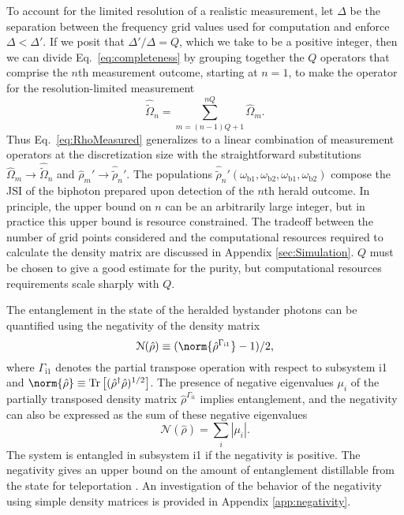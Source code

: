 \documentclass[twocolumn,amssymb, nobibnotes, showpacs, aps, pra,10pt]{revtex4-1}
\newcommand*{\wbone}{\omega_{\textrm{b}1}}
\newcommand*{\wbtwo}{\omega_{\textrm{b}2}}
\DeclareMathOperator*{\trace}{\textrm{Tr}}
\begin{document}
To account for the limited resolution of a realistic measurement, let $\Delta$ be the separation between the frequency grid values used for computation and enforce $\Delta < \Delta'$. If we posit that $\Delta'/\Delta = Q$, which we take to be a positive integer, then we can divide Eq.\ \eqref{eq:completeness} by grouping together the $Q$ operators that comprise the $n$th measurement outcome, starting at $n=1$, to make the operator for the resolution-limited measurement
\begin{equation}\label{eq:binDef}
\hat{\widetilde{\Omega}}_{n} = \sum_{m=(n-1)Q+1}^{nQ} \hat{\Omega}_{m}.
\end{equation}
Thus Eq.\ \eqref{eq:RhoMeasured} generalizes to a linear combination of measurement operators at the discretization size with the straightforward substitutions $\hat{\Omega}_m \to \hat{\widetilde{\Omega}}_{n}$ and $\hat{\rho}_m' \to \hat{\widetilde{\rho}}_n'$. The populations  $\hat{\widetilde{\rho}}_n' (\wbone,\wbtwo,\wbone,\wbtwo)$ compose the JSI of the biphoton prepared upon detection of the $n$th herald outcome. In principle, the upper bound on $n$ can be an arbitrarily large integer, but in practice this upper bound is resource constrained. The tradeoff between the number of grid points considered and the computational resources required to calculate the density matrix are discussed in Appendix \ref{sec:Simulation}. $Q$ must be chosen to give a good estimate for the purity, but computational resources requirements scale sharply with $Q$.

The entanglement in the state of the heralded bystander photons can be quantified using the negativity of the density matrix \cite{Vidal2002}
\begin{equation}
\mathcal{N}(\hat{\rho})\equiv (\norm{\hat{\rho}^{\Gamma_\textrm{i1}}}-1)/2, \label{eq:negDef}
\end{equation}
where ${\Gamma_\textrm{i1}}$ denotes the partial transpose operation with respect to subsystem i1 and $\norm{\hat{\rho}}\equiv\trace\left[(\hat{\rho}^\dagger\hat{\rho})^{1/2}\right]$. The presence of negative eigenvalues $\mu_i$ of the partially   transposed density matrix $\hat{\rho}^{\Gamma_\textrm{i1}}$ implies entanglement, and the negativity can also be expressed as the sum of these negative eigenvalues
\begin{equation}
\mathcal{N}(\hat{\rho}) = \sum_i \left| \mu_i \right| .
\end{equation}
The system is entangled in subsystem i1 if the negativity is positive. The negativity gives an upper bound on the amount of entanglement distillable from the state for teleportation \cite{Bouwmeester1997}. An investigation of the behavior of the negativity using simple density matrices is provided in Appendix \ref{app:negativity}. 
\end{document}
